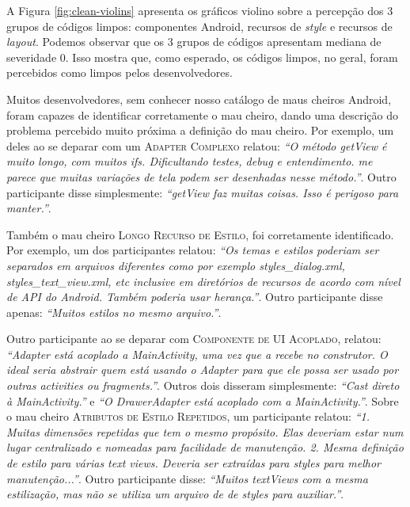 A Figura \ref{fig:clean-violins} apresenta os gráficos violino sobre a percepção dos 3 grupos de códigos limpos: componentes Android, recursos de \textit{style} e recursos de \textit{layout}. Podemos observar que os 3 grupos de códigos apresentam mediana de severidade 0. Isso mostra que, como esperado, os códigos limpos, no geral, foram percebidos como limpos pelos desenvolvedores.

Muitos desenvolvedores, sem conhecer nosso catálogo de maus cheiros Android, foram capazes de identificar corretamente o mau cheiro, dando uma descrição do problema percebido muito próxima a definição do mau cheiro. Por exemplo, um deles ao se deparar com um \textsc{\small Adapter Complexo} relatou: \textit{``O método getView é muito longo, com muitos ifs. Dificultando testes, debug e entendimento. me parece que muitas variações de tela podem ser desenhadas nesse método.''}. Outro participante disse simplesmente: \textit{``getView faz muitas coisas. Isso é perigoso para manter.''}.

Também o mau cheiro \textsc{\small Longo Recurso de Estilo}, foi corretamente identificado. Por exemplo, um dos participantes relatou: \textit{``Os temas e estilos poderiam ser separados em arquivos diferentes como por exemplo styles\_dialog.xml, styles\_text\_view.xml, etc inclusive em diretórios de recursos de acordo com nível de API do Android. Também poderia usar herança.''}. Outro participante disse apenas: \textit{``Muitos estilos no mesmo arquivo.''}.

Outro participante ao se deparar com \textsc{\small Componente de UI Acoplado}, relatou: \textit{``Adapter está acoplado a MainActivity, uma vez que a recebe no construtor. O ideal seria abstrair quem está usando o Adapter para que ele possa ser usado por outras activities ou fragments.''}. Outros dois disseram simplesmente: \textit{``Cast direto à MainActivity.''} e \textit{``O DrawerAdapter está acoplado com a MainActivity.''}. Sobre o mau cheiro \textsc{\small Atributos de Estilo Repetidos}, um participante relatou: \textit{``1. Muitas dimensões repetidas que tem o mesmo propósito. Elas deveriam estar num lugar centralizado e nomeadas para facilidade de manutenção. 2. Mesma definição de estilo para várias text views. Deveria ser extraídas para styles para melhor manutenção...''}. Outro participante disse: \textit{``Muitos textViews com a mesma estilização, mas não se utiliza um arquivo de de styles para auxiliar.''}.

